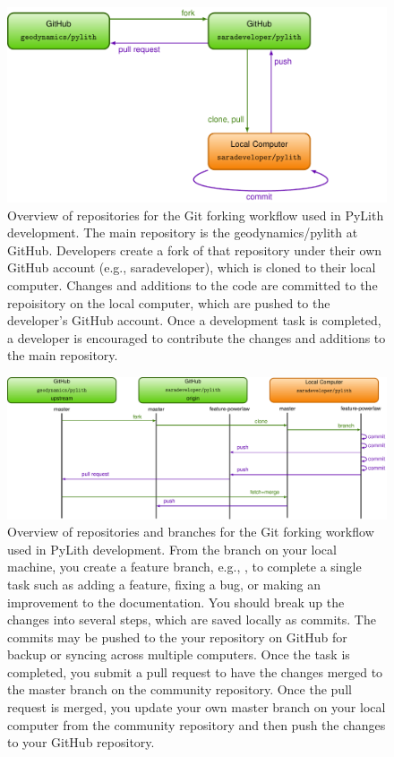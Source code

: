 \begin{figure}[htbp]
  \includegraphics[scale=0.7]{developer/figs/gitworkflow_repositories}
  \caption{Overview of repositories for the Git forking workflow used in PyLith
    development. The main repository is the
    geodynamics/pylith at GitHub. Developers create a fork
    of that repository under their own GitHub account (e.g.,
    saradeveloper), which is cloned to their local computer. Changes
    and additions to the code are committed to the repoisitory on the
    local computer, which are pushed to the developer's GitHub
    account. Once a development task is completed, a developer is
    encouraged to contribute the changes and additions to the main
    repository.}
  \label{fig:developer:git:repositories}
\end{figure}

\begin{figure}[htbp]
  \includegraphics[scale=0.7]{developer/figs/gitworkflow_branch}
  \caption{Overview of repositories and branches for the Git forking
    workflow used in PyLith development. From the 
    branch on your local machine, you create a feature
    branch, e.g., , to complete a single
    task such as adding a feature, fixing a bug, or making an
    improvement to the documentation. You should break
    up the changes into several steps, which are saved locally as
    commits. The commits may be pushed to the your repository
    on GitHub for backup or syncing across multiple computers. Once the
    task is completed, you submit a pull request to have
    the changes merged to the master branch on the community
    repository. Once the pull request is merged, you update
    your own master branch on your local computer from the community
    repository and then push the changes to your GitHub repository.}
  \label{fig:developer:git:branch}
\end{figure}

